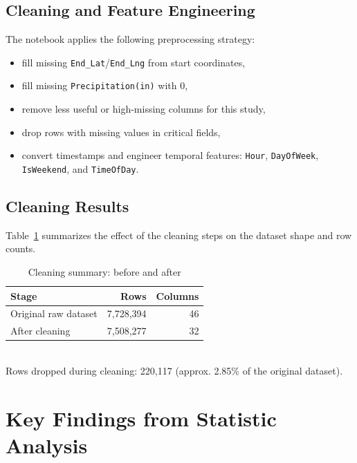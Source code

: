 \documentclass[11pt]{article}
\begin{document}
\subsection{Cleaning and Feature Engineering}
The notebook applies the following preprocessing strategy:
\begin{itemize}
    \item fill missing \texttt{End\_Lat}/\texttt{End\_Lng} from start coordinates,
    \item fill missing \texttt{Precipitation(in)} with 0,
    \item remove less useful or high-missing columns for this study,
    \item drop rows with missing values in critical fields,
    \item convert timestamps and engineer temporal features:
          \texttt{Hour}, \texttt{DayOfWeek}, \texttt{IsWeekend}, and \texttt{TimeOfDay}.
\end{itemize}

\subsection{Cleaning Results}
Table~\ref{tab:cleaning_summary} summarizes the effect of the cleaning steps on the dataset shape and row counts.

\begin{table}[H]
    \centering
    \caption{Cleaning summary: before and after}
    \label{tab:cleaning_summary}
    \begin{tabular}{lrr}
        \toprule
        Stage                & Rows          & Columns \\
        \midrule
        Original raw dataset & 7{,}728{,}394 & 46      \\
        After cleaning       & 7{,}508{,}277 & 32      \\
        \bottomrule
    \end{tabular}
    \\
    \vspace{2mm}
    \small{Rows dropped during cleaning: 220{,}117 (approx. 2.85\% of the original dataset).}
\end{table}


\newpage
\section{Key Findings from Statistic Analysis}
\end{document}
